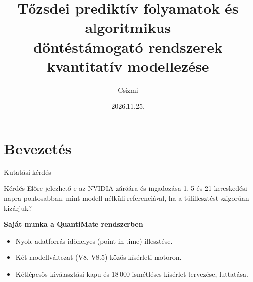 \documentclass[aspectratio=169,11pt]{beamer}
\title[QuantiMate]{Tőzsdei prediktív folyamatok és algoritmikus\\döntéstámogató rendszerek kvantitatív modellezése}
\author{Csizmi}
\institute[EKKE]{}
\date[]{2026.11.25.}
\begin{document}

\section{Bevezetés}
\begin{frame}
  \titlepage
\end{frame}

\begin{frame}{Kutatási kérdés}
  \begin{block}{Kérdés}
    Előre jelezhető-e az NVIDIA záróára és ingadozása 1, 5 és 21
    kereskedési napra pontosabban, mint modell nélküli referenciával,
    ha a túlillesztést szigorúan kizárjuk?
  \end{block}
  \medskip
  \textbf{Saját munka a QuantiMate rendszerben}
  \begin{itemize}
    \item Nyolc adatforrás időhelyes (point-in-time) illesztése.
    \item Két modellváltozat (V8, V8.5) közös kísérleti motoron.
    \item Kétlépcsős kiválasztási kapu és 18\,000 ismétléses kísérlet
          tervezése, futtatása.
  \end{itemize}
\end{frame}

\end{document}
